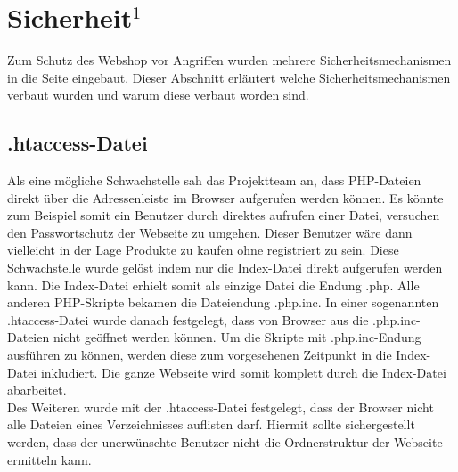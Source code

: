\newpage
\section{Sicherheit$^1$}
Zum Schutz des Webshop vor Angriffen wurden mehrere Sicherheitsmechanismen in die Seite eingebaut. Dieser Abschnitt erläutert welche Sicherheitsmechanismen verbaut wurden und warum diese verbaut worden sind.

\subsection{\glqq .htaccess\grqq{}-Datei}
Als eine mögliche Schwachstelle sah das Projektteam an, dass PHP-Dateien direkt über die Adressenleiste im Browser aufgerufen werden können. Es könnte zum Beispiel somit ein Benutzer durch direktes aufrufen einer Datei, versuchen den Passwortschutz der Webseite zu umgehen. Dieser Benutzer wäre dann vielleicht in der Lage Produkte zu kaufen ohne registriert zu sein. Diese Schwachstelle wurde gelöst indem nur die Index-Datei direkt aufgerufen werden kann. Die Index-Datei erhielt somit als einzige Datei die Endung \glqq *.php\grqq{}. Alle anderen PHP-Skripte bekamen die Dateiendung \glqq *.php.inc\grqq{}. In einer sogenannten \glqq .htaccess\grqq{}-Datei wurde danach festgelegt, dass von Browser aus die \glqq *.php.inc\grqq{}-Dateien nicht geöffnet werden können. Um die Skripte mit \glqq *.php.inc\grqq{}-Endung ausführen zu können, werden diese zum vorgesehenen Zeitpunkt in die Index-Datei inkludiert. Die ganze Webseite wird somit komplett durch die Index-Datei abarbeitet.\\
Des Weiteren wurde mit der \glqq .htaccess\grqq{}-Datei festgelegt, dass der Browser nicht alle Dateien eines Verzeichnisses auflisten darf. Hiermit sollte sichergestellt werden, dass der unerwünschte Benutzer nicht die Ordnerstruktur der Webseite ermitteln kann.

